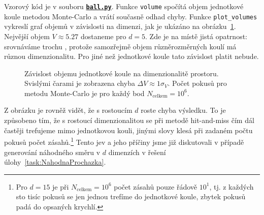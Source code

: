 \documentclass[a4paper,11pt,twoside]{article}
\def\code#1{\textnormal{\texttt{#1}}}
\def\ghfile#1#2{\textnormal{\textbf{\texttt{\href{https://github.com/PavelStransky/PCInPhysics2021/blob/main/#1#2}{#2}}}}}
\theoremstyle{red}
\theoremstyle{green}
\begin{document}
            \begin{solution}
                Vzorový kód je v souboru \ghfile{python/montecarlo/}{ball.py}.
                Funkce \code{volume} spočítá objem jednotkové koule metodou Monte-Carlo a vrátí současně odhad chyby.
                Funkce \code{plot_volumes} vykreslí graf objemů v závislosti na dimenzi, jak je ukázáno na obrázku~\ref{fig:VolumeBall}.
                Nejvější objem $V\approx5.27$ dostaneme pro $d=5$.
                Zde je na místě jistá opatrnost: srovnáváme trochu , protože samozřejmě objem různěrozměrných koulí má různou dimenzionalitu.
                Pro jiné než jednotkové koule tato závislost platit nebude.

                \begin{figure}[!htbp]
                    \centering{}
                    \caption{
                        \protect\small
                        Závislost objemu jednotkové koule na dimenzionalitě prostoru.
                        Svislými čarami je zobrazena chyba $\Delta V\approx1\sigma_{V}$.
                        Počet pokusů pro metodu Monte-Carlo je pro každý bod $N_{\text{celkem}}=10^{6}$.
                    }
                    \label{fig:VolumeBall}
                \end{figure}
    
                Z obrázku je rovněž vidět, že s rostoucím $d$ roste chyba výsledku.
                To je způsobeno tím, že s rostoucí dimenzionalitou se při metodě hit-and-miss čím dál častěji trefujeme mimo jednotkovou kouli, jinými slovy klesá při zadaném počtu pokusů počet zásahů.\footnote{
                    Pro $d=15$ je při $N_{\text{celkem}}=10^6$ počet zásahů pouze řádově $10^1$, tj. z každých sto tisíc pokusů se jen jednou trefíme do jednotkové koule, zbytek pokusů padá do  opsaných krychlí.
                }
                Tento jev a jeho příčiny jsme již diskutovali v případě generování náhodného směru v $d$ dimenzích v řešení úlohy~\ref{task:NahodnaProchazka}.
            \end{solution}
\end{document}
